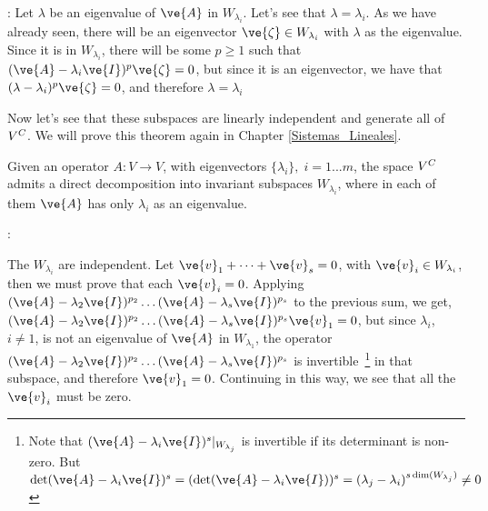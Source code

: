 \pru: Let $\lambda$ be an eigenvalue of $\ve{A}$ in $W_{\lambda_i}$. 
Let's see that $\lambda = \lambda_i$. 
As we have already seen, there will be an eigenvector $\ve{\zeta} \in W_{\lambda_i}$ 
with $\lambda$ as the eigenvalue.
Since it is in $W_{\lambda_i}$, there will be some $p \geq 1$ such that 
$(\ve{A} - \lambda_i \ve{I})^p \ve{\zeta} = 0$, but since it is an eigenvector, we have that
$(\lambda - \lambda_i)^p \ve{\zeta} = 0$, and therefore $\lambda = \lambda_i$
\epru
\espa

Now let's see that these subspaces are linearly independent and generate
all of $V^{C}$. 
We will prove this theorem again in Chapter \ref{Sistemas_Lineales}.

Given an operator $A: V \to V$, with eigenvectors $\{ \lambda_i \}, \; i=1...m$, 
the space $V^{C}$ admits a direct decomposition into invariant subspaces 
$W_{\lambda_i}$,
where in each of them $\ve{A}$ has only $\lambda_i$ as an eigenvalue.
\eteo

\pru:

The $W_{\lambda_i}$ are independent. 
Let $\ve{v}_1 + \dots + \ve{v}_s = 0$, with
$\ve{v}_i \in W_{\lambda_i}$, then we must prove that each $\ve{v}_i=0$.
Applying 
$(\ve{A} - \lambda_2 \ve{I})^{p_2}\dots (\ve{A} - \lambda_s \ve{I})^{p_s}$
to the previous sum, we get,
$(\ve{A} - \lambda_2 \ve{I})^{p_2}\dots (\ve{A} - \lambda_s \ve{I})^{p_s}\ve{v}_1 =0$,
but since $\lambda_i$, $i \neq 1$, is not an eigenvalue of $\ve{A}$ in $W_{\lambda_1}$,
the operator 
$(\ve{A} - \lambda_2 \ve{I})^{p_2}\dots (\ve{A} - \lambda_s \ve{I})^{p_s}$ is 
invertible~\footnote{
Note that $(\ve{A} - \lambda_i \ve{I})^{s}|_{W_{\lambda_j}}$ 
is invertible if its determinant is non-zero. 
But 
$\det (\ve{A} - \lambda_i \ve{I})^{s} = (\det(\ve{A} - \lambda_i \ve{I}))^s 
= (\lambda_j - \lambda_i)^{s \dim (W_{\lambda_j})} \neq 0$
}
in that subspace, and therefore $\ve{v}_1 =0$. Continuing in this way, we see that all
the $\ve{v}_i$ must be zero.

